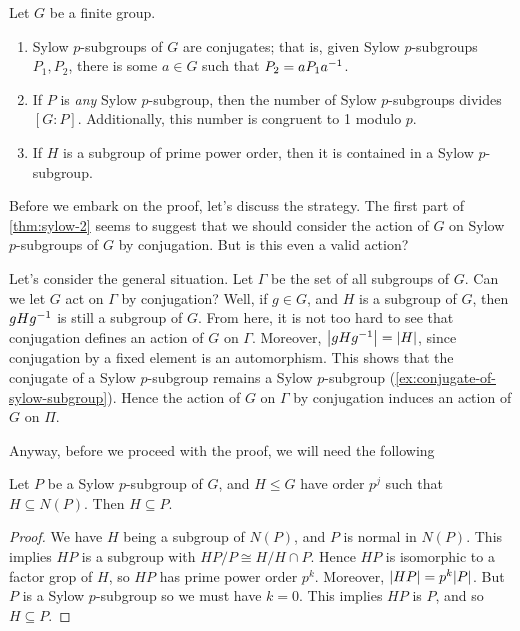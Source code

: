 \documentclass[./main.tex]{subfiles}
\begin{document}
\begin{theorem}
\label{thm:sylow-2}
    Let $G$ be a finite group. 
    \begin{enumerate}[label=(\arabic*)]
        \item Sylow $p$-subgroups of $G$ are conjugates; that is, given Sylow
        $p$-subgroups $P_1, P_2$, there is some $a \in G$ such that $P_2 = a P_1
        a^{-1}$.

        \item If $P$ is \emph{any} Sylow $p$-subgroup, then the number of Sylow
        $p$-subgroups divides $[G:P]$. Additionally, this number is congruent to
        1 modulo $p$.

        \item If $H$ is a subgroup of prime power order, then it is contained in
        a Sylow $p$-subgroup.
    \end{enumerate}
\end{theorem}

Before we embark on the proof, let's discuss the strategy. The first part of
\cref{thm:sylow-2} seems to suggest that we should consider the action of $G$ on
Sylow $p$-subgroups of $G$ by conjugation. But is this even a valid action? 

Let's consider the general situation. Let $\Gamma$ be the set of all subgroups
of $G$. Can we let $G$ act on $\Gamma$ by conjugation? Well, if $g \in G$, and
$H$ is a subgroup of $G$, then $gHg^{-1}$ is still a subgroup of $G$. From here,
it is not too hard to see that conjugation defines an action of $G$ on $\Gamma$.
Moreover, $\abs{gHg\inv} = \abs H$, since conjugation by a fixed element is an
automorphism. This shows that the conjugate of a Sylow $p$-subgroup remains a
Sylow $p$-subgroup (\cref{ex:conjugate-of-sylow-subgroup}). Hence the action of
$G$ on $\Gamma$ by conjugation induces an action of $G$ on $\Pi$.


Anyway, before we proceed with the proof, we will need the following
\begin{lemma}
\label{lem:p-subgroups-contained-in-normalizers-of-sylow-subgroups}
    Let $P$ be a Sylow $p$-subgroup of $G$, and $H \leq G$ have order $p^j$ such
    that $H \subseteq N(P)$. Then $H \subseteq P$.
\end{lemma}
\begin{proof}
    We have $H$ being a subgroup of $N(P)$, and $P$ is normal in $N(P)$. This
    implies $HP$ is a subgroup with $HP/P \cong H /H \cap P$. Hence $HP$ is
    isomorphic to a factor grop of $H$, so $HP$ has prime power order $p^k$.
    Moreover, $\abs{HP} = p^k \abs P$. But $P$ is a Sylow $p$-subgroup so we
    must have $k = 0$. This implies $HP$ is $P$, and so $H \subseteq P$.
\end{proof}
\end{document}

